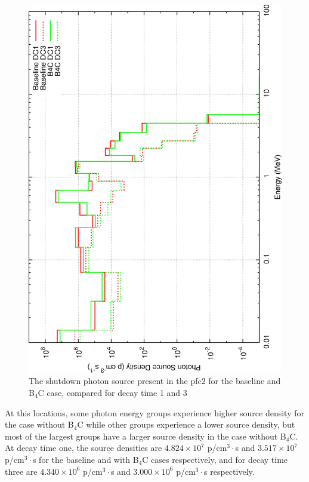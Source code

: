 \documentclass[12pt]{article}
\begin{document}
\begin{figure}[ht!]
  \centering
  \includegraphics[angle=-90,clip,scale=0.15]{../plots/source_comparison/pf2_spectra.png}     
  \caption{The shutdown photon source present in the \gls{pfc}2 for the baseline and B$_4$C case, compared 
  for decay time 1 and 3}
  \label{fig:src_spectra_pf2}
\end{figure}

At this locations, some photon energy groups experience higher source density
for the case without B$_4$C while other groups experience a lower source
density, but most of the largest groups have a larger source density in the
case without B$_4$C.  At decay time one, the source densities are
$4.824\times10^7$ p/cm$^3\cdot$s and $3.517\times10^7$ p/cm$^3\cdot$s for the
baseline and with B$_4$C cases respectively, and for decay time three are
$4.340\times10^6$ p/cm$^3\cdot$s and $3.000\times10^6$ p/cm$^3\cdot$s
respectively.
\end{document}
